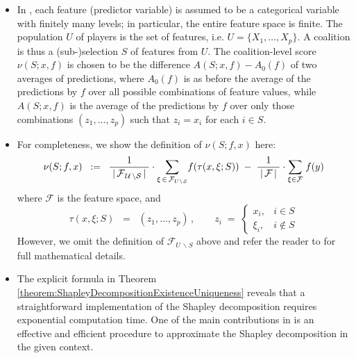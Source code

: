 \begin{itemize}
\begin{itemize}
	\item
		In \cite{Strumbelj2010},
		each feature (predictor variable) is assumed to be a categorical variable
		with finitely many levels;
		in particular, the entire feature space is finite.
		The population $U$ of players is the set of features, i.e. $U = \{X_{1},\ldots,X_{p}\}$.
		A coalition is thus a (sub-)selection $S$ of features from $U$.
		The coalition-level score $\nu(S;x,f)$ is chosen to be the difference
		$A(S;x,f) - A_{0}(f)$
		of two averages of predictions, where $A_{0}(f)$ is as before
		the average of the predictions by $f$ over all possible combinations of feature values,
		while $A(S;x,f)$ is the average of the predictions by $f$ over only those combinations
		$(z_{1},\ldots,z_{p})$ such that $z_{i} = x_{i}$ for each $i \in S$.

	\item
		For completeness, we show the definition of $\nu(S;f,x)$ here:
		\begin{equation*}
		\nu(S;f,x)
		\;\; := \;\;
			\dfrac{1}{{\color{white}.}\vert\,\mathcal{F_{\,U\,\backslash S}}\,\vert{\color{white}.}}
			\cdot
			\underset{\xi\,\in\,\mathcal{F}_{U \backslash S}}{\sum}f(\tau(x,\xi;S))
			\; - \;
			\dfrac{1}{{\color{white}.}\vert\,\mathcal{F}\,\vert{\color{white}.}}
			\cdot
			\underset{\xi \in \mathcal{F}}{\sum}\;f(y)
		\end{equation*}
		where $\mathcal{F}$ is the feature space, and
		\begin{equation*}
		\tau(x,\xi;S) \;\; = \;\; (z_{1},\ldots,z_{p})\,,
		\quad\quad
		z_{i}
		\; = \;
			\left\{\begin{array}{cl}
			x_{i}, & i \in S
			\\
			\xi_{i}, & i \notin S
			\end{array}\right.
		\end{equation*}
		However, we omit the definition of $\mathcal{F}_{U\,\backslash S}$ above and
		refer the reader to \cite{Strumbelj2010} for full mathematical details.

	\item
		The explicit formula in
		Theorem \ref{theorem:ShapleyDecompositionExistenceUniqueness}
		reveals that a straightforward implementation of the Shapley decomposition
		requires exponential computation time.
		One of the main contributions in \cite{Strumbelj2010} is
		an effective and efficient procedure to approximate
		the Shapley decomposition in the given context.


\end{itemize}
\end{itemize}
